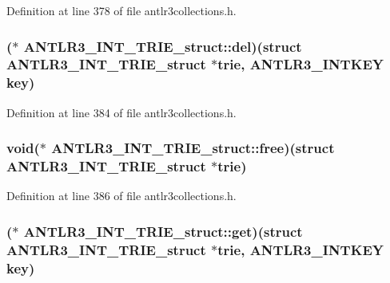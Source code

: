 Definition at line 378 of file antlr3collections.\-h.

\hypertarget{struct_a_n_t_l_r3___i_n_t___t_r_i_e__struct_a85d2a0c76d3e6edc7ff985a15eecde71}{
\subsubsection[{del}]{($\ast$ A\-N\-T\-L\-R3\-\_\-\-I\-N\-T\-\_\-\-T\-R\-I\-E\-\_\-struct\-::del)(struct {\bf A\-N\-T\-L\-R3\-\_\-\-I\-N\-T\-\_\-\-T\-R\-I\-E\-\_\-struct} $\ast$trie, {\bf A\-N\-T\-L\-R3\-\_\-\-I\-N\-T\-K\-E\-Y} key)}}\label{struct_a_n_t_l_r3___i_n_t___t_r_i_e__struct_a85d2a0c76d3e6edc7ff985a15eecde71}


Definition at line 384 of file antlr3collections.\-h.

\hypertarget{struct_a_n_t_l_r3___i_n_t___t_r_i_e__struct_a3b80efe15e4309b61038feb16abc9e75}{
\subsubsection[{free}]{\setlength{\rightskip}{0pt plus 5cm}void($\ast$ A\-N\-T\-L\-R3\-\_\-\-I\-N\-T\-\_\-\-T\-R\-I\-E\-\_\-struct\-::free)(struct {\bf A\-N\-T\-L\-R3\-\_\-\-I\-N\-T\-\_\-\-T\-R\-I\-E\-\_\-struct} $\ast$trie)}}\label{struct_a_n_t_l_r3___i_n_t___t_r_i_e__struct_a3b80efe15e4309b61038feb16abc9e75}


Definition at line 386 of file antlr3collections.\-h.

\hypertarget{struct_a_n_t_l_r3___i_n_t___t_r_i_e__struct_a9c352f4919e25cbb65316887519952e0}{
\subsubsection[{get}]{($\ast$ A\-N\-T\-L\-R3\-\_\-\-I\-N\-T\-\_\-\-T\-R\-I\-E\-\_\-struct\-::get)(struct {\bf A\-N\-T\-L\-R3\-\_\-\-I\-N\-T\-\_\-\-T\-R\-I\-E\-\_\-struct} $\ast$trie, {\bf A\-N\-T\-L\-R3\-\_\-\-I\-N\-T\-K\-E\-Y} key)}}\label{struct_a_n_t_l_r3___i_n_t___t_r_i_e__struct_a9c352f4919e25cbb65316887519952e0}


